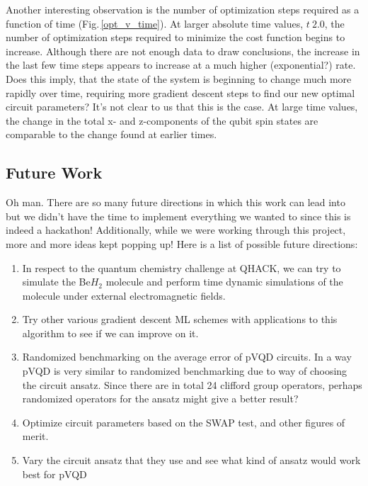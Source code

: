 \documentclass{article}
\begin{document}
Another interesting observation is the number of optimization steps required as a function of time (Fig.\,\ref{opt_v_time}). At larger absolute time values, $t ~ 2.0$, the number of optimization steps required to minimize the cost function begins to increase. Although there are not enough data to draw conclusions, the increase in the last few time steps appears to increase at a much higher (exponential?) rate. Does this imply, that the state of the system is beginning to change much more rapidly over time, requiring more gradient descent steps to find our new optimal circuit parameters? It's not clear to us that this is the case.  At large time values, the change in the total x- and z-components of the qubit spin states are comparable to the change found at earlier times.

\subsection{Future Work}
Oh man. There are so many future directions in which this work can lead into but we didn't have the time to implement everything we wanted to since this is indeed a hackathon! Additionally, while we were working through this project, more and more ideas kept popping up! Here is a list of possible future directions:
\begin{enumerate}
    \item In respect to the quantum chemistry challenge at QHACK, we can try to simulate the Be$H_2$ molecule and perform time dynamic simulations of the molecule under external electromagnetic fields.
    \item Try other various gradient descent ML schemes with applications to this algorithm to see if we can improve on it.
    \item Randomized benchmarking on the average error of pVQD circuits. In a way pVQD is very similar to randomized benchmarking due to way of choosing the circuit ansatz. Since there are in total 24 clifford group operators, perhaps randomized operators for the ansatz might give a better result?
    \item Optimize circuit parameters based on the SWAP test, and other figures of merit.
    \item Vary the circuit ansatz that they use and see what kind of ansatz would work best for pVQD
\end{enumerate}



\end{document}
